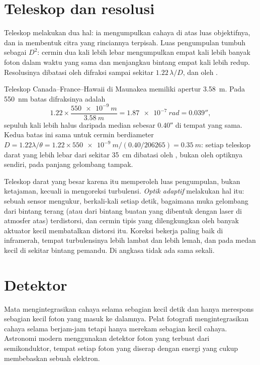 \section{Teleskop dan resolusi}

Teleskop melakukan dua hal: ia mengumpulkan cahaya di atas luas objektifnya, dan ia membentuk citra yang rinciannya terpisah. Luas pengumpulan tumbuh sebagai $D^2$: cermin dua kali lebih lebar mengumpulkan empat kali lebih banyak foton dalam waktu yang sama dan menjangkau bintang empat kali lebih redup. Resolusinya dibatasi oleh difraksi sampai sekitar $1.22\,\lambda/D$, dan oleh .

\begin{example}
Teleskop Canada--France--Hawaii di Maunakea memiliki apertur \qty{3.58}{m}. Pada \qty{550}{nm} batas difraksinya adalah
\[
  1.22\times\frac{\qty{550e-9}{m}}{\qty{3.58}{m}} = \qty{1.87e-7}{rad}
  = \ang{;;0.039},
\]
sepuluh kali lebih halus daripada median  sebesar \ang{;;0.40} di tempat yang sama. Kedua batas ini sama untuk cermin berdiameter $D = 1.22\lambda/\theta =
1.22\times\qty{550e-9}{m}/(\num{0.40}/\num{206265}) = \qty{0.35}{m}$: setiap teleskop darat yang lebih lebar dari sekitar \qty{35}{cm} dibatasi oleh , bukan oleh optiknya sendiri, pada panjang gelombang tampak.
\end{example}

Teleskop darat yang besar karena itu memperoleh luas pengumpulan, bukan ketajaman, kecuali ia mengoreksi turbulensi. \emph{Optik adaptif} melakukan hal itu: sebuah sensor mengukur, berkali-kali setiap detik, bagaimana muka gelombang dari bintang terang (atau dari bintang buatan yang dibentuk dengan laser di atmosfer atas) terdistorsi, dan cermin tipis yang dilengkungkan oleh banyak aktuator kecil membatalkan distorsi itu. Koreksi bekerja paling baik di inframerah, tempat turbulensinya lebih lambat dan lebih lemah, dan pada medan kecil di sekitar bintang pemandu. Di angkasa tidak ada  sama sekali.

\section{Detektor}

Mata mengintegrasikan cahaya selama sebagian kecil detik dan hanya merespons sebagian kecil foton yang masuk ke dalamnya. Pelat fotografi mengintegrasikan cahaya selama berjam-jam tetapi hanya merekam sebagian kecil cahaya. Astronomi modern menggunakan detektor foton yang terbuat dari semikonduktor, tempat setiap foton yang diserap dengan energi yang cukup membebaskan sebuah elektron.

